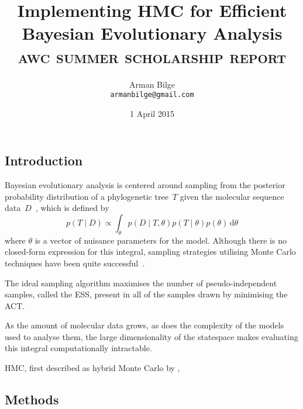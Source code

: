 \documentclass{article}
\title{Implementing \acl{HMC} for Efficient Bayesian Evolutionary Analysis \\
           \Large\textsc{awc summer scholarship report}}
\author{Arman Bilge \\ \texttt{armanbilge@gmail.com}}
\date{1 April 2015}
\newcommand{\dd}{\, \mathrm{d}}
\begin{document}
    \maketitle

    \subsection*{Introduction}

    Bayesian evolutionary analysis is centered around sampling from the
        posterior probability distribution of a phylogenetic tree~$T$ given the
        molecular sequence
        data~$D$~\cite{Bou+14}, which is defined by
        \begin{equation}
            p\left(T \mid D\right)
                \propto \int_\theta p\left(D \mid T,\theta\right)
                p\left(T \mid \theta\right) p\left(\theta\right) \dd\theta
        \end{equation}
        where $\theta$ is a vector of nuisance parameters for the model.
    Although there is no closed-form expression for this integral, sampling
        strategies utilising Monte Carlo techniques have been quite
        successful~\cite{RH03,Dru+12,Bou+14}.

    The ideal sampling algorithm maximises the number of pseudo-independent
        samples, called the \ac{ESS}, present in all of the samples drawn by
        minimising the \ac{ACT}.

    As the amount of molecular data grows, as does the complexity of the models
        used to analyse them, the large dimensionality of the statespace makes
        evaluating this integral computationally intractable.

    \ac{HMC}, first described as hybrid Monte Carlo by \textcite{Dua+87},

    \subsection*{Methods}
\end{document}
